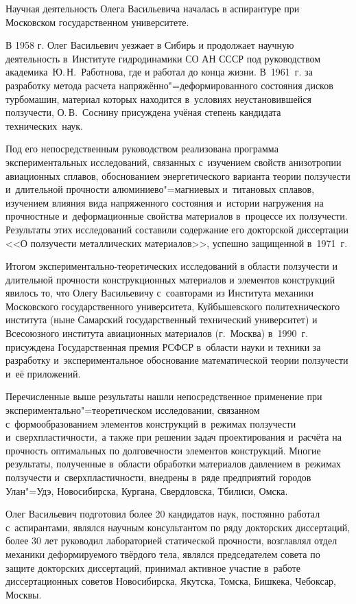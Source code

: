 Научная деятельность Олега Васильевича началась в аспирантуре при Московском государственном университете.

В 1958 г. Олег Васильевич уезжает в Сибирь и продолжает научную дея\-тельность в~Институте гидродинамики СО АН СССР под руководством академика~Ю.\,Н.~Работнова, где и работал до конца жизни. В~1961~г. за разработку метода расчета напряжённо"=деформированного состояния дисков турбомашин, материал которых находится в~условиях неустановившейся ползучести, О.\,В.~Соснину присуждена учёная степень кандидата технических~наук.

Под его непосредственным руководством реализована программа экспериментальных исследований, связанных с~изучением свойств анизотропии авиационных сплавов, обоснованием энергетического варианта теории ползучести и~длительной прочности алюминиево"=магниевых и~титановых сплавов, изучением влияния вида напряженного состояния и~истории нагружения на прочностные и~деформационные свойства материалов  в~процессе их ползучести. 
Результаты этих исследований составили содержание его докторской диссертации <<О ползучести металлических материалов>>, успешно защищенной в~1971~г.

Итогом экспериментально-теоретических исследований в области ползучести и длительной прочности конструкционных материалов и элементов конструкций явилось то, что Олегу Васильевичу с~соавторами
из Института механики Московского государственного университета, Куйбышевского политехнического института (ныне Самарский государственный технический университет) и Всесоюзного института авиационных материалов (г.~Москва)
 в~1990~г. присуждена Государственная премия РСФСР в~области науки и техники за разработку и~экспериментальное обоснование математической теории ползучести и~её приложений.
 
Перечисленные выше результаты нашли непосредственное применение при экспериментально"=теоретическом исследовании, связанном с~формообразованием элементов конструкций в~режимах ползучести и~сверхпластичности,~а также при решении задач проектирования и~расчёта на прочность оптимальных по долговечности элементов конструкций. 
Многие результаты, полученные в~области обработки материалов давлением в~режимах ползучести и~сверхпластичности, внедрены в~ряде предприятий городов Улан"=Удэ, Новосибирска, Кургана, Свердловска, Тбилиси, Омска.

Олег Васильевич подготовил более 20 кандидатов наук, постоянно работал с~аспирантами, являлся научным консультантом по ряду докторских диссертаций, более 30 лет руководил лабораторией статической прочности, возглавлял отдел механики деформируемого твёрдого тела, являлся председателем совета по защите докторских диссертаций, принимал активное участие в~работе диссертационных советов Новосибирска, Якутска, Томска, Бишкека, Чебоксар, Москвы.

